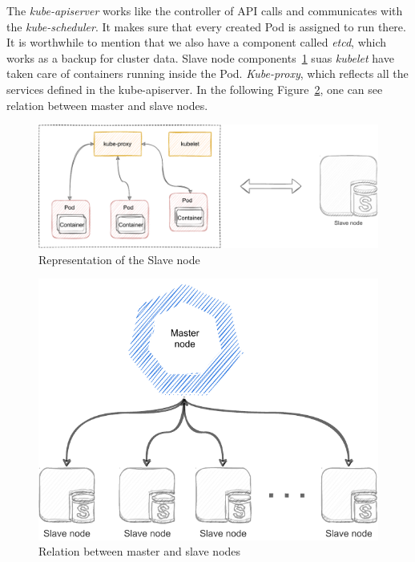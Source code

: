 The \emph{kube-apiserver} works like the controller of API calls and communicates with the \emph{kube-scheduler}.
It makes sure that every created Pod is assigned to run there.
It is worthwhile to mention that we also have a component called \emph{etcd}, which works as a backup for cluster data.
Slave node components~\ref{02:fig:slaveNode} suas \emph{kubelet} have taken care of containers running inside the Pod. \emph{Kube-proxy}, which reflects all the services defined in the kube-apiserver.
In the following Figure~\ref{02:fig:masterAndSlaveNode}, one can see relation between master and slave nodes.

\begin{figure}[!h]
    \centering
    \includegraphics[scale=0.82]{obrazky-figures/02-preliminaries/01-kubernetes/02-architecture-slave-sketch}
    \caption{Representation of the Slave node}
    \label{02:fig:slaveNode}
\end{figure}


\begin{figure}[!h]
    \centering
    \includegraphics[scale=0.92]{obrazky-figures/02-preliminaries/01-kubernetes/02-final-architecture-master-slave}
    \caption{Relation between master and slave nodes}
    \label{02:fig:masterAndSlaveNode}
\end{figure}

